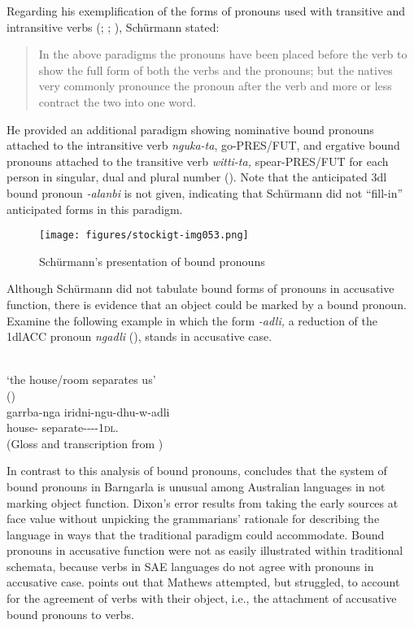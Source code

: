 Regarding his exemplification of the forms of pronouns used with transitive and intransitive verbs (; ; ), Schürmann stated:

\begin{quote}
	In the above paradigms the pronouns have been placed before the verb to show the full form of both the verbs and the pronouns; but the natives very commonly pronounce the pronoun after the verb and more or less contract the two into one word. \citep[22]{schurmann_vocabulary_1844}
\end{quote}

He provided an additional paradigm showing nominative bound pronouns attached to the intransitive verb \textit{nguka-ta}, go-PRES/FUT, and ergative bound pronouns attached to the transitive verb \textit{witti-ta,} spear-PRES/FUT for each person in singular, dual and plural number (). Note that the anticipated 3dl bound pronoun \textit{-alanbi} is not given, indicating that Schürmann did not “fill-in” anticipated forms in this paradigm.


\begin{figure}
\texttt{[image: figures/stockigt-img053.png]}
\caption{Schürmann’s presentation of bound pronouns \citeyearpar[22]{schurmann_vocabulary_1844}}
\label{fig:key:109}
\end{figure}

Although Schürmann did not tabulate bound forms of pronouns in accusative function, there is evidence that an object could be marked by a bound pronoun. Examine the following example in which the form \textit{-adli,} a reduction of the 1dlACC pronoun \textit{ngadli} (), stands in accusative case.

\ea\label{ex:key:49} %
 \\
{`the house/room separates us'} \\
\glt (\citealt[V:8]{schurmann_vocabulary_1844}) \\
\gll garrba-nga   iridni-ngu-dhu-w-adli \\
house-   separate----1\textsc{dl}.\\
\glt (Gloss and transcription from \citealt[44]{Clendon2015})
\z

In contrast to this analysis of bound pronouns, \citet[345]{dixon_preface_2002} concludes that the system of bound pronouns in Barngarla is unusual among Australian languages in not marking object function. Dixon’s error results from taking the early sources at face value without unpicking the grammarians' rationale for describing the language in ways that the traditional paradigm could accommodate. Bound pronouns in accusative function were not as easily illustrated within traditional schemata, because verbs in SAE languages do not agree with pronouns in accusative case. \citet[203--204]{koch_r_2008} points out that Mathews attempted, but struggled, to account for the agreement of verbs with their object, i.e., the attachment of accusative bound pronouns to verbs.

